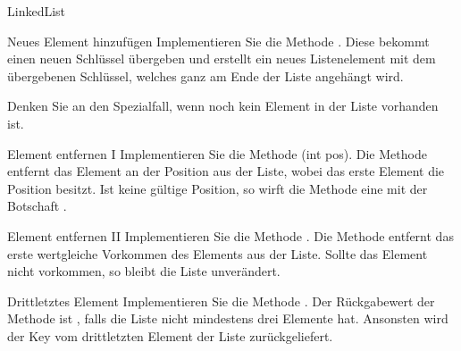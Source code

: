 \documentclass{../tuda-exercise}
\begin{document}
\begin{task}{LinkedList}
    \begin{subtask*}[credit=\stars{1}{3}]{Neues Element hinzufügen}
      Implementieren Sie die Methode . Diese bekommt einen neuen
      Schlüssel übergeben und erstellt ein neues Listenelement mit dem übergebenen Schlüssel,
      welches ganz am Ende der Liste angehängt wird.

      \br

      Denken Sie an den Spezialfall, wenn noch kein Element in der Liste vorhanden ist.

      \begin{solution}
        
      \end{solution}
    \end{subtask*}

    \clearpagesolution

    \begin{subtask*}[credit=\stars{1}{3}]{Element entfernen I}
      Implementieren Sie die Methode (int pos). Die Methode entfernt das
      Element an der Position  aus der Liste, wobei das erste Element die
      Position  besitzt. Ist  keine gültige Position, so wirft die
      Methode eine  mit der Botschaft
      \code{\textcolor{stringcolor}{"'Invalid position!"'}}.

      \begin{solution}
        
      \end{solution}
    \end{subtask*}

    \clearpagesolution

    \begin{subtask*}[credit=\stars{1}{3}]{Element entfernen II}
      Implementieren Sie die Methode . Die Methode entfernt das
      erste wertgleiche Vorkommen des Elements  aus der Liste. Sollte das Element
      nicht vorkommen, so bleibt die Liste unverändert.

      \begin{solution}
        
      \end{solution}
    \end{subtask*}

    \clearpagesolution

    \begin{subtask*}[credit=\stars{2}{3}]{Drittletztes Element}
      Implementieren Sie die Methode . Der Rückgabewert der
      Methode ist , falls die Liste nicht mindestens drei Elemente hat.
      Ansonsten wird der Key vom drittletzten Element der Liste zurückgeliefert.


\end{subtask*}
\end{task}
\end{document}
